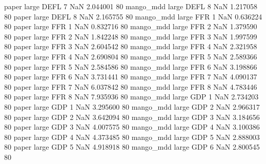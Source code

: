             paper      large     DEFL                 7                  NaN 2.044001 80
        mango_mdd      large     DEFL                 8                  NaN 1.217058 80
            paper      large     DEFL                 8                  NaN 2.165755 80
        mango_mdd      large      FFR                 1                  NaN 0.636224 80
            paper      large      FFR                 1                  NaN 0.832716 80
        mango_mdd      large      FFR                 2                  NaN 1.379590 80
            paper      large      FFR                 2                  NaN 1.842248 80
        mango_mdd      large      FFR                 3                  NaN 1.997599 80
            paper      large      FFR                 3                  NaN 2.604542 80
        mango_mdd      large      FFR                 4                  NaN 2.321958 80
            paper      large      FFR                 4                  NaN 2.690804 80
        mango_mdd      large      FFR                 5                  NaN 2.589366 80
            paper      large      FFR                 5                  NaN 2.584586 80
        mango_mdd      large      FFR                 6                  NaN 3.198866 80
            paper      large      FFR                 6                  NaN 3.731441 80
        mango_mdd      large      FFR                 7                  NaN 4.090137 80
            paper      large      FFR                 7                  NaN 6.037842 80
        mango_mdd      large      FFR                 8                  NaN 4.783446 80
            paper      large      FFR                 8                  NaN 7.935936 80
        mango_mdd      large      GDP                 1                  NaN 2.734203 80
            paper      large      GDP                 1                  NaN 3.295600 80
        mango_mdd      large      GDP                 2                  NaN 2.966317 80
            paper      large      GDP                 2                  NaN 3.642094 80
        mango_mdd      large      GDP                 3                  NaN 3.184656 80
            paper      large      GDP                 3                  NaN 4.007575 80
        mango_mdd      large      GDP                 4                  NaN 3.100386 80
            paper      large      GDP                 4                  NaN 4.373485 80
        mango_mdd      large      GDP                 5                  NaN 2.888003 80
            paper      large      GDP                 5                  NaN 4.918918 80
        mango_mdd      large      GDP                 6                  NaN 2.800545 80
